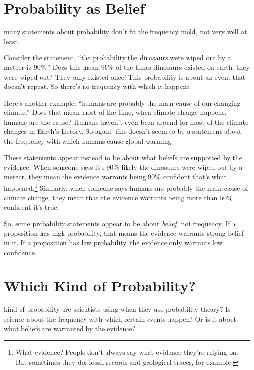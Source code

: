 \documentclass[justified]{tufte-book}
\theoremstyle{definition}
\theoremstyle{definition}
\theoremstyle{definition}
\theoremstyle{remark}
\begin{document}
\hypertarget{probability-as-belief}{%
\section{Probability as Belief}\label{probability-as-belief}}

 many statements about probability don't fit the frequency mold, not very well at least.

Consider the statement, ``the probability the dinosaurs were wiped out by a meteor is \(90\%\).'' Does this mean \(90\%\) of the times dinosaurs existed on earth, they were wiped out? They only existed once! This probability is about an event that doesn't repeat. So there's no frequency with which it happens.

Here's another example: ``humans are probably the main cause of our changing climate.'' Does that mean most of the time, when climate change happens, humans are the cause? Humans haven't even been around for most of the climate changes in Earth's history. So again: this doesn't seem to be a statement about the frequency with which humans cause global warming.

These statements appear instead to be about what beliefs are supported by the evidence. When someone says it's \(90\%\) likely the dinosaurs were wiped out by a meteor, they mean the evidence warrants being \(90\%\) confident that's what happened.\footnote{What evidence? People don't always say what evidence they're relying on. But sometimes they do: fossil records and geological traces, for example.} Similarly, when someone says humans are probably the main cause of climate change, they mean that the evidence warrants being more than \(50\%\) confident it's true.

So, some probability statements appear to be about \emph{belief}, not frequency. If a proposition has high probability, that means the evidence warrants strong belief in it. If a proposition has low probability, the evidence only warrants low confidence.

\hypertarget{which-kind-of-probability}{%
\section{Which Kind of Probability?}\label{which-kind-of-probability}}

 kind of probability are scientists using when they use probability theory? Is science about the frequency with which certain events happen? Or is it about what beliefs are warranted by the evidence?
\end{document}
